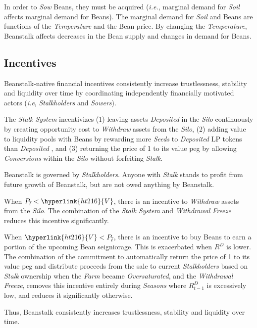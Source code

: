\documentclass[tikz]{article}
\newcommand{\term}[1]{\textsl{#1}}
\newcommand{\Bean}{} %
\begin{document}
In order to \term{Sow} Beans, they must be acquired (\term{i.e.}, marginal demand for \term{Soil} affects marginal demand for Beans). The marginal demand for \term{Soil} and Beans are functions of the \term{Temperature} and the Bean price. By changing the \term{Temperature}, Beanstalk affects decreases in the Bean supply and changes in demand for Beans. 

\subsection{Incentives}
Beanstalk-native financial incentives consistently increase trustlessness, stability and liquidity over time by coordinating independently financially motivated actors (\term{i.e}, \term{Stalkholders} and \term{Sowers}). 

The \term{Stalk System} incentivizes (1) leaving assets \term{Deposited} in the \term{Silo} continuously by creating opportunity cost to \term{Withdraw} assets from the \term{Silo}, (2) adding value to liquidity pools with Beans by rewarding more \term{Seeds} to \term{Deposited} LP tokens than \term{Deposited} \Bean, and (3) returning the price of \Bean1 to its value peg by allowing \term{Conversions} within the \term{Silo} without forfeiting \term{Stalk}.

Beanstalk is governed by \term{Stalkholders}. Anyone with \term{Stalk} stands to profit from future growth of Beanstalk, but are not owed anything by Beanstalk. 

When $P_{\overline{t}} < \hyperlink{ht216}{V}$, there is an incentive to \term{Withdraw} assets from the \term{Silo}. The combination of the \term{Stalk System} and \term{Withdrawal} \term{Freeze} reduces this incentive significantly.

When $\hyperlink{ht216}{V} < P_{\overline{t}}$, there is an incentive to buy Beans to earn a portion of the upcoming Bean seigniorage. This is exacerbated when \hyperlink{ht156}{$R^D$} is lower. The combination of the commitment to automatically return the price of \Bean1 to its value peg and distribute proceeds from the sale to current \term{Stalkholders} based on \term{Stalk} ownership when the \term{Farm} became \term{Oversaturated}, and the \term{Withdrawal} \term{Freeze}, removes this incentive entirely during \term{Seasons} where \hyperlink{ht157}{$R^D_{t-1}$} is excessively low, and reduces it significantly otherwise.

Thus, Beanstalk consistently increases trustlessness, stability and liquidity over time.
\end{document}
